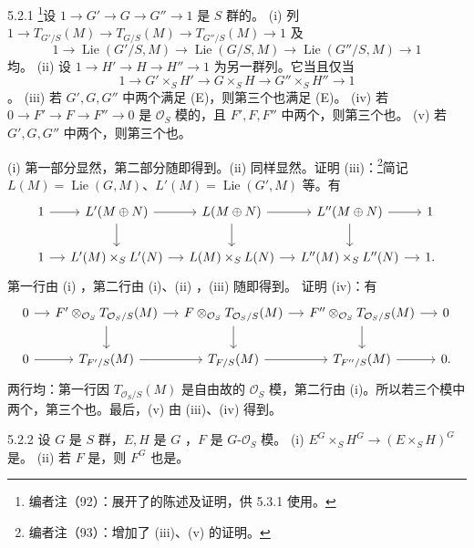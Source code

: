\begin{SGAresult}{}{5.2.1}
\footnote{编者注（92）：展开了的陈述及证明，供 5.3.1 使用。}设 $1\to G'\to G\to G''\to1$ 是 $S$ 群的。
(i) 列 $1\to T_{G'/S}(M)\to T_{G/S}(M)\to T_{G''/S}(M)\to1$ 及
\[1\to\operatorname{Lie}(G'/S,M)\to\operatorname{Lie}(G/S,M)\to\operatorname{Lie}(G''/S,M)\to1\]
均。
(ii) 设 $1\to H'\to H\to H''\to1$ 为另一群列。它当且仅当
\[1\to G'\times_SH'\to G\times_SH\to G''\times_SH''\to1\]
。
(iii) 若 $G',G,G''$ 中两个满足 (E)，则第三个也满足 (E)。
(iv) 若 $0\to F'\to F\to F''\to0$ 是 $\mathcal O_S$ 模的，且 $F',F,F''$ 中两个，则第三个也。
(v) 若 $G',G,G''$ 中两个，则第三个也。
\end{SGAresult}
(i) 第一部分显然，第二部分随即得到。(ii) 同样显然。证明 (iii)：\footnote{编者注（93）：增加了 (iii)、(v) 的证明。}简记 $L(M)=\operatorname{Lie}(G,M)$、$L'(M)=\operatorname{Lie}(G',M)$ 等。有
\[\begin{tikzcd}[column sep=small]
1\arrow[r]&L'(M\oplus N)\arrow[r]\arrow[d]&L(M\oplus N)\arrow[r]\arrow[d]&L''(M\oplus N)\arrow[r]\arrow[d]&1\\
1\arrow[r]&L'(M)\times_SL'(N)\arrow[r]&L(M)\times_SL(N)\arrow[r]&L''(M)\times_SL''(N)\arrow[r]&1.
\end{tikzcd}\]
第一行由 (i) ，第二行由 (i)、(ii) ，(iii) 随即得到。
证明 (iv)：有
\[\begin{tikzcd}[column sep=small]
0\arrow[r]&F'\otimes_{\mathcal O_S}T_{\mathcal O_S/S}(M)\arrow[r]\arrow[d]&F\otimes_{\mathcal O_S}T_{\mathcal O_S/S}(M)\arrow[r]\arrow[d]&F''\otimes_{\mathcal O_S}T_{\mathcal O_S/S}(M)\arrow[r]\arrow[d]&0\\
0\arrow[r]&T_{F'/S}(M)\arrow[r]&T_{F/S}(M)\arrow[r]&T_{F''/S}(M)\arrow[r]&0.
\end{tikzcd}\]
两行均：第一行因 $T_{\mathcal O_S/S}(M)$ 是自由故的 $\mathcal O_S$ 模，第二行由 (i)。所以若三个模中两个，第三个也。最后，(v) 由 (iii)、(iv) 得到。
\begin{SGAresult}{}{5.2.2}
设 $G$ 是 $S$ 群，$E,H$ 是 $G$ ，$F$ 是 $G$-$\mathcal O_S$ 模。
(i)  $E^G\times_SH^G\to(E\times_SH)^G$ 是。
(ii) 若 $F$ 是，则 $F^G$ 也是。
\end{SGAresult}
